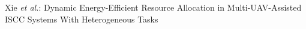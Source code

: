 \documentclass[10pt,journal,compsoc]{IEEEtran}
\begin{document}
%
%



{Xie \MakeLowercase{\textit{et al.}}: Dynamic Energy-Efficient Resource Allocation in Multi-UAV-Assisted ISCC Systems With Heterogeneous Tasks}

%



\end{document}
